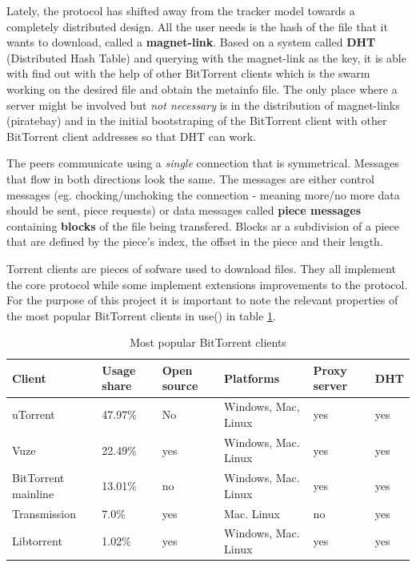 \documentclass[11pt]{book} %
\begin{document}
Lately, the protocol has shifted away from the tracker model towards a completely distributed design. All the user needs is the hash of the file that it wants to download, called a \textbf{magnet-link}. Based on a system called \textbf{DHT} (Distributed Hash Table) and querying with the magnet-link as the key, it is able with find out with the help of other BitTorrent clients which is the swarm working on the desired file and obtain the metainfo file. The only place where a server might be involved but \textit{not necessary} is in the distribution of magnet-links (piratebay) and in the initial bootstraping of the BitTorrent client with other BitTorrent client addresses so that DHT can work.

The peers communicate using a \textit{single} connection that is symmetrical. Messages that flow in both directions look the same. The messages are either control messages (eg. chocking/unchoking the connection - meaning more/no more data should be sent, piece requests) or data messages called \textbf{piece messages} containing \textbf{blocks} of the file being transfered. Blocks ar a subdivision of a piece that are defined by the piece's index, the offset in the piece and their length.


Torrent clients are pieces of sofware used to download files. They all implement the core protocol while some implement extensions improvements to the protocol.
For the purpose of this project it is important to note the relevant properties of the most popular BitTorrent clients in use(\citep*{btUsage}) in table \ref{btClients}.


\begin{table}
    \begin{tabular}{|l|l|l|l|l|l|}
    \hline
    Client              & Usage share & Open source & Platforms                                   & Proxy server & DHT \\ \hline
    uTorrent            & 47.97\%     & No          & Windows, Mac, Linux  & yes          & yes \\ \hline
    Vuze                & 22.49\%     & yes         & Windows, Mac. Linux                         & yes          & yes \\ \hline
    BitTorrent mainline & 13.01\%     & no          & Windows, Mac. Linux                         & yes          & yes \\ \hline
    Transmission        & 7.0\%       & yes         & Mac. Linux                                  & no           & yes \\ \hline
    Libtorrent          & 1.02\%      & yes         & Windows, Mac. Linux                         & yes          & yes \\ \hline
    \end{tabular}
    \caption {Most popular BitTorrent clients}
    \label {btClients}
\end{table}
\end{document}
